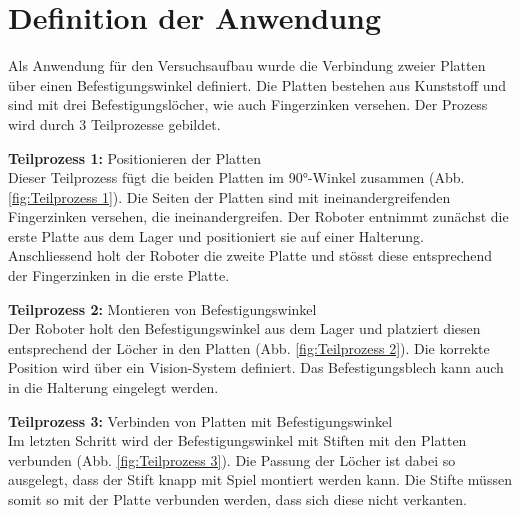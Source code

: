 \section{Definition der Anwendung} \label{Anwendungsdefinition}
	Als Anwendung für den Versuchsaufbau wurde die Verbindung zweier Platten über einen Befestigungswinkel definiert. Die Platten bestehen aus Kunststoff und sind mit drei Befestigungslöcher, wie auch Fingerzinken versehen. Der Prozess wird durch 3 Teilprozesse gebildet. 
	\vspace{3mm}
	
	\textbf{Teilprozess 1:} Positionieren der Platten
	\vspace{2mm} 
	\\
	 Dieser Teilprozess fügt die beiden Platten im 90°-Winkel zusammen (Abb. \ref{fig:Teilprozess 1}). Die Seiten der Platten sind mit ineinandergreifenden Fingerzinken versehen, die ineinandergreifen. Der Roboter entnimmt zunächst die erste Platte aus dem Lager und positioniert sie auf einer Halterung. Anschliessend holt der Roboter die zweite Platte und stösst diese entsprechend der Fingerzinken in die erste Platte.
	 \vspace{3mm} 
	 
	 \textbf{Teilprozess 2:} Montieren von Befestigungswinkel 
	 \vspace{2mm}
	 \\
	 Der Roboter holt den Befestigungswinkel aus dem Lager und platziert diesen entsprechend der Löcher in den Platten (Abb. \ref{fig:Teilprozess 2}). Die korrekte Position wird über ein Vision-System definiert. Das Befestigungsblech kann auch in die Halterung eingelegt werden.
	 \vspace{3mm}
	 
	 \textbf{Teilprozess 3:} Verbinden von Platten mit Befestigungswinkel 
	 \vspace{2mm} 
	 \\
	 Im letzten Schritt wird der Befestigungswinkel mit Stiften mit den Platten verbunden (Abb. \ref{fig:Teilprozess 3}). Die Passung der Löcher ist dabei so ausgelegt, dass der Stift knapp mit Spiel montiert werden kann. Die Stifte müssen somit so mit der Platte verbunden werden, dass sich diese nicht verkanten. 
	 \vspace{3mm}
	 
